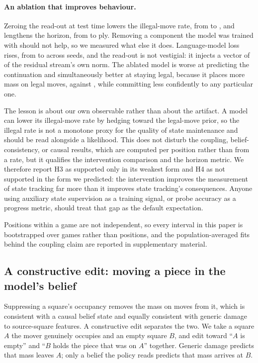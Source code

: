 \documentclass[11pt]{article}
\theoremstyle{remark}
\begin{document}
\paragraph{An ablation that improves behaviour.}
Zeroing the read-out at test time lowers the illegal-move rate, from
 to , and lengthens the horizon, from
 to  ply. Removing a component the model was
trained with should not help, so we measured what else it does. Language-model
loss rises, from  to  across seeds, and the
read-out is not vestigial: it injects a vector of  of the
residual stream's own norm. The ablated model is worse at predicting the
continuation and simultaneously better at staying legal, because it places more
mass on legal moves,  against , while
committing less confidently to any particular one.

The lesson is about our own observable rather than about the artifact. A model
can lower its illegal-move rate by hedging toward the legal-move prior, so the
illegal rate is not a monotone proxy for the quality of state maintenance and
should be read alongside a likelihood. This does not disturb the coupling,
belief-consistency, or causal results, which are computed per position rather
than from a rate, but it qualifies the intervention comparison and the horizon
metric. We therefore report H3 as supported only in its weakest form and H4 as
not supported in the form we predicted: the intervention improves the measurement
of state tracking far more than it improves state tracking's consequences.
Anyone using auxiliary state supervision as a training signal, or probe accuracy
as a progress metric, should treat that gap as the default expectation.

Positions within a game are not independent, so every interval in this paper is bootstrapped over games rather than positions, and the population-averaged fits behind the coupling claim are reported in supplementary material.

\subsection{A constructive edit: moving a piece in the model's belief}
\label{sec:transfer}

Suppressing a square's occupancy removes the mass on moves from it, which is
consistent with a causal belief state and equally consistent with generic damage
to source-square features. A constructive edit separates the two. We take a
square $A$ the mover genuinely occupies and an empty square $B$, and edit toward
``$A$ is empty'' and ``$B$ holds the piece that was on $A$'' together. Generic
damage predicts that mass leaves $A$; only a belief the policy reads predicts
that mass arrives at $B$.
\end{document}
